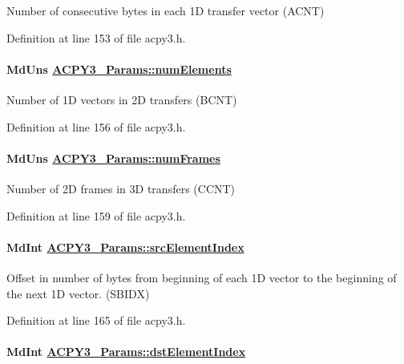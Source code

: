 Number of consecutive bytes in each 1D transfer vector (ACNT) 

Definition at line 153 of file acpy3.h.\hypertarget{struct_a_c_p_y3___params_25aedccf3cbee0af1a8c051af3a03fe1}{
\paragraph[numElements]{\setlength{\rightskip}{0pt plus 5cm}Md\-Uns \hyperlink{struct_a_c_p_y3___params_25aedccf3cbee0af1a8c051af3a03fe1}{ACPY3\_\-Params::num\-Elements}}\hfill}
\label{struct_a_c_p_y3___params_25aedccf3cbee0af1a8c051af3a03fe1}


Number of 1D vectors in 2D transfers (BCNT) 

Definition at line 156 of file acpy3.h.\hypertarget{struct_a_c_p_y3___params_91cb11498468c82cdbcdc41a7584e033}{
\paragraph[numFrames]{\setlength{\rightskip}{0pt plus 5cm}Md\-Uns \hyperlink{struct_a_c_p_y3___params_91cb11498468c82cdbcdc41a7584e033}{ACPY3\_\-Params::num\-Frames}}\hfill}
\label{struct_a_c_p_y3___params_91cb11498468c82cdbcdc41a7584e033}


Number of 2D frames in 3D transfers (CCNT) 

Definition at line 159 of file acpy3.h.\hypertarget{struct_a_c_p_y3___params_9931ebb9b098d4c4f86189790d4daf93}{
\paragraph[srcElementIndex]{\setlength{\rightskip}{0pt plus 5cm}Md\-Int \hyperlink{struct_a_c_p_y3___params_9931ebb9b098d4c4f86189790d4daf93}{ACPY3\_\-Params::src\-Element\-Index}}\hfill}
\label{struct_a_c_p_y3___params_9931ebb9b098d4c4f86189790d4daf93}


Offset in number of bytes from beginning of each 1D vector to the beginning of the next 1D vector. (SBIDX) 

Definition at line 165 of file acpy3.h.\hypertarget{struct_a_c_p_y3___params_3c697084d1170b24a3f4160470ab3b0c}{
\paragraph[dstElementIndex]{\setlength{\rightskip}{0pt plus 5cm}Md\-Int \hyperlink{struct_a_c_p_y3___params_3c697084d1170b24a3f4160470ab3b0c}{ACPY3\_\-Params::dst\-Element\-Index}}\hfill}
\label{struct_a_c_p_y3___params_3c697084d1170b24a3f4160470ab3b0c}


